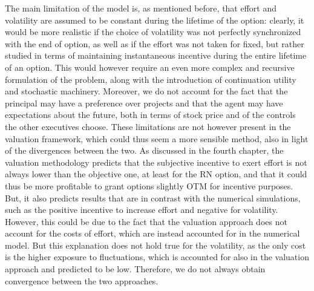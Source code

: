 The main limitation of the model is, as mentioned before, that effort and volatility are assumed to be constant during the lifetime of the option: clearly, it would be more realistic if the choice of volatility was not perfectly synchronized with the end of option, as well as if the effort was not taken for fixed, but rather studied in terms of maintaining instantaneous incentive during the entire lifetime of an option. This would however require an even more complex and recursive formulation of the problem, along with the introduction of continuation utility and stochastic machinery. Moreover, we do not account for the fact that the principal may have a preference over projects and that the agent may have expectations about the future, both in terms of stock price and of the controls the other executives choose. These limitations are not however present in the valuation framework, which could thus seem a more sensible method, also in light of the divergences between the two. As discussed in the fourth chapter, the valuation methodology predicts that the subjective incentive to exert effort is not always lower than the objective one, at least for the RN option, and that it could thus be more profitable to grant options slightly OTM for incentive purposes. But, it also predicts results that are in contrast with the numerical simulations, such as the positive incentive to increase effort and negative for volatility. However, this could be due to the fact that the valuation approach does not account for the costs of effort, which are instead accounted for in the numerical model. But this explanation does not hold true for the volatility, as the only cost is the higher exposure to fluctuations, which is accounted for also in the valuation approach and predicted to be low. Therefore, we do not always obtain convergence between the two approaches.

